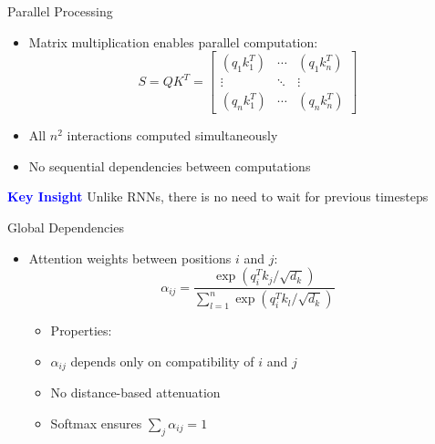 \documentclass[serif, aspectratio=169]{beamer}
\begin{document}
\begin{frame}{Parallel Processing}
    \begin{itemize}
        \item Matrix multiplication enables parallel computation:
        \begin{equation*}
            S = QK^T = \begin{bmatrix}
            (q_1k_1^T) & \cdots & (q_1k_n^T) \\
            \vdots & \ddots & \vdots \\
            (q_nk_1^T) & \cdots & (q_nk_n^T)
            \end{bmatrix}
        \end{equation*}
        \item All $n^2$ interactions computed simultaneously
        \item No sequential dependencies between computations
    \end{itemize}
    \textcolor{blue}{\textbf{Key Insight}}
    \newline
        Unlike RNNs, there is no need to wait for previous timesteps
\end{frame}

\begin{frame}{Global Dependencies}
    \begin{itemize}
        \item Attention weights between positions $i$ and $j$:
        \begin{equation*}
            \alpha_{ij} = \frac{\exp(q_i^Tk_j/\sqrt{d_k})}{\sum_{l=1}^n \exp(q_i^Tk_l/\sqrt{d_k})}
        \end{equation*}
        \begin{itemize}
            \item Properties:
            \item $\alpha_{ij}$ depends only on compatibility of $i$ and $j$
            \item No distance-based attenuation
            \item Softmax ensures $\sum_j \alpha_{ij} = 1$
        \end{itemize}
    \end{itemize}
\end{frame}

\end{document}
